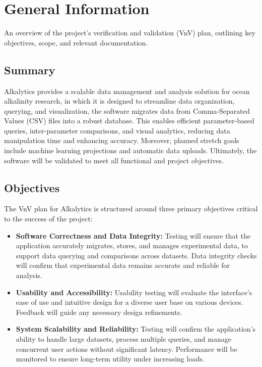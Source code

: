 \documentclass[12pt, titlepage]{article}
\begin{document}
\newpage


\section{General Information}
An overview of the project's verification and validation (VnV) plan, outlining
key objectives, scope, and relevant documentation.
\subsection{Summary}

Alkalytics provides a scalable data management and analysis solution for ocean
alkalinity research, in which it is designed to streamline data organization,
querying, and visualization, the software migrates data from Comma-Separated
Values (CSV) files into a robust database. This enables efficient
parameter-based queries, inter-parameter comparisons, and visual analytics,
reducing data manipulation time and enhancing accuracy. Moreover, planned
stretch goals include machine learning projections and automatic data uploads.
Ultimately, the software will be validated to meet all functional and project
objectives.


\subsection{Objectives}

The VnV plan for Alkalytics is structured around three primary objectives
critical to the success of the project:

\begin{itemize}
  \item \textbf{Software Correctness and Data Integrity:} Testing will ensure
  that the application accurately migrates, stores, and manages experimental
  data, to support data querying and comparisons across datasets. Data integrity
  checks will confirm that experimental data remains accurate and reliable for
  analysis.

  \item \textbf{Usability and Accessibility:} Usability testing will evaluate
  the interface’s ease of use and intuitive design for a diverse user base on
  various devices. Feedback will guide any necessary design refinements.
  
  \item \textbf{System Scalability and Reliability:} Testing will confirm the
  application's ability to handle large datasets, process multiple queries, and
  manage concurrent user actions without significant latency. Performance will
  be monitored to ensure long-term utility under increasing loads.
  
\end{itemize}
\end{document}

